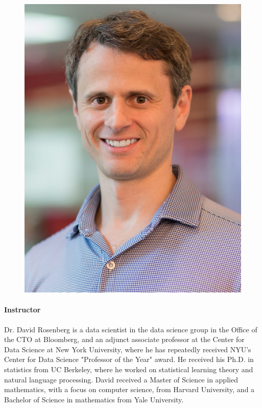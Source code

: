 \documentclass[11pt]{article}
\begin{document}
\begin{figure}
 \vspace{-25pt}
  \begin{center}
    \includegraphics[width=\linewidth]{David_Rosenberg.jpg}
  \end{center}  
  \vspace{-25pt}
\end{figure}

\paragraph{Instructor}
Dr. David Rosenberg is a data scientist in the data science group in the
Office of the CTO at Bloomberg, and an adjunct associate professor at
the Center for Data Science at New York University, where he has
repeatedly received NYU's Center for Data Science "Professor of the
Year" award. He received his Ph.D. in statistics from UC Berkeley,
where he worked on statistical learning theory and natural language
processing. David received a Master of Science in applied mathematics,
with a focus on computer science, from Harvard University, and a
Bachelor of Science in mathematics from Yale University.
\end{document}

